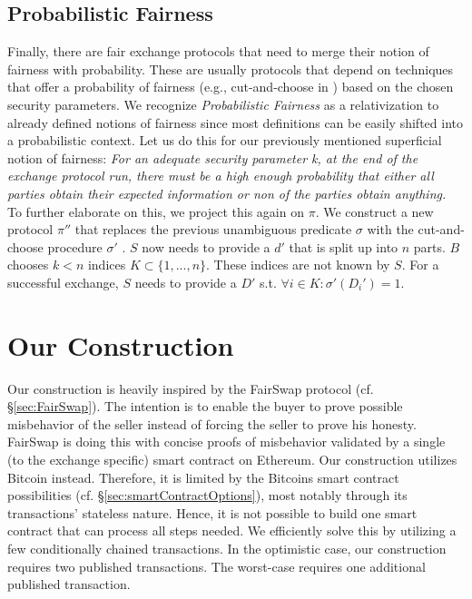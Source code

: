 \documentclass{cacthesis}
\newcounter{protocol}
\begin{document}
        \section{Probabilistic Fairness}
        \label{sec:ProbabilisticFairness}
        Finally, there are fair exchange protocols that need to merge their notion of fairness with probability. These are usually protocols that depend on techniques that offer a probability of fairness (e.g., cut-and-choose in \cite{DELGADOSEGURA2020832}) based on the chosen security parameters. We recognize \textit{Probabilistic Fairness} as a relativization to already defined notions of fairness since most definitions can be easily shifted into a probabilistic context. Let us do this for our previously mentioned superficial notion of fairness: \textit{For an adequate security parameter k, at the end of the exchange protocol run, there must be a high enough probability that either all parties obtain their expected information or non of the parties obtain anything.} \\
        To further elaborate on this, we project this again on $\pi$. We construct a new protocol $\pi''$ that replaces the previous unambiguous predicate $\sigma$ with the cut-and-choose procedure $\sigma'$ . $S$ now needs to provide a $d'$ that is split up into $n$ parts. $B$ chooses $k < n$ indices $K \subset \{1, ..., n\}$. These indices are not known by $S$. For a successful exchange, $S$ needs to provide a $D'$ s.t. $\forall i\in K:\sigma'\left( D_{i}'\right) =1$. \\

		
	\chapter{Our Construction}
	   \label{ch:Construction}
	   Our construction is heavily inspired by the FairSwap protocol (cf. §\ref{sec:FairSwap}). The intention is to enable the buyer to prove possible misbehavior of the seller instead of forcing the seller to prove his honesty. FairSwap is doing this with concise proofs of misbehavior validated by a single (to the exchange specific) smart contract on Ethereum. Our construction utilizes Bitcoin instead. Therefore, it is limited by the Bitcoins smart contract possibilities (cf. §\ref{sec:smartContractOptions}), most notably through its transactions' stateless nature. Hence, it is not possible to build one smart contract that can process all steps needed. We efficiently solve this by utilizing a few conditionally chained transactions. In the optimistic case, our construction requires two published transactions. The worst-case requires one additional published transaction.
	   
\end{document}
